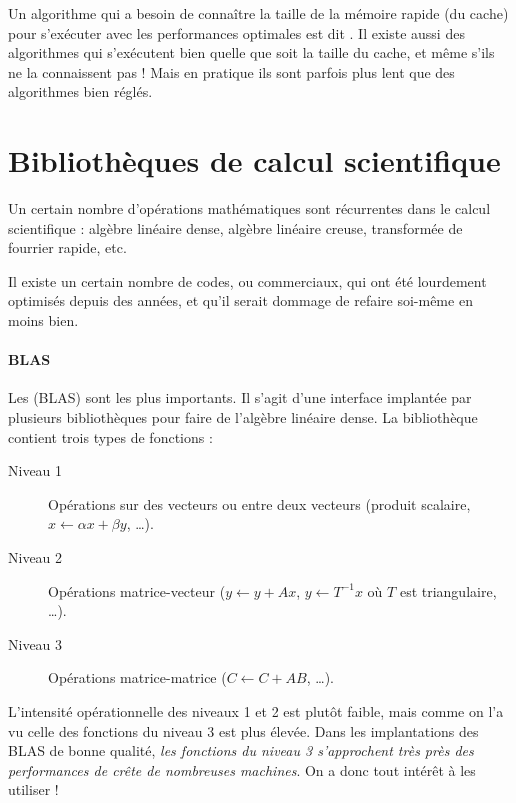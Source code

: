 \begin{danger}
  Un algorithme qui a besoin de connaître la taille de la mémoire rapide (du
  cache) pour s'exécuter avec les performances optimales est dit \og
  \fg. Il existe aussi des algorithmes \og
  \fg qui s'exécutent bien quelle que soit la taille du
  cache, et même s'ils ne la connaissent pas ! Mais en pratique ils sont parfois
  plus lent que des algorithmes  bien réglés.
\end{danger}

\section{Bibliothèques de calcul scientifique}

Un certain nombre d'opérations mathématiques sont récurrentes dans le calcul
scientifique : algèbre linéaire dense, algèbre linéaire creuse, transformée de
fourrier rapide, etc.

Il existe un certain nombre de codes,  ou commerciaux, qui
ont été lourdement optimisés depuis des années, et qu'il serait dommage de
refaire soi-même en moins bien.

\paragraph{BLAS} Les  (BLAS) sont les
plus importants. Il s'agit d'une interface implantée par plusieurs bibliothèques
pour faire de l'algèbre linéaire dense. La bibliothèque contient trois types de
fonctions :

\begin{description}
\item[Niveau 1] Opérations sur des vecteurs ou entre deux vecteurs (produit scalaire, $x \gets \alpha x + \beta y$, \dots).
\item[Niveau 2] Opérations matrice-vecteur ($y \gets y + Ax$, $y \gets T^{-1}x$ où $T$ est triangulaire, \dots).
\item[Niveau 3] Opérations matrice-matrice ($C \gets C + AB$, \dots).
\end{description}

L'intensité opérationnelle des niveaux 1 et 2 est plutôt faible, mais comme on
l'a vu celle des fonctions du niveau 3 est plus élevée. Dans les implantations
des BLAS de bonne qualité, \emph{les fonctions du niveau 3 s'approchent très
  près des performances de crête de nombreuses machines}. On a donc tout intérêt
à les utiliser !

